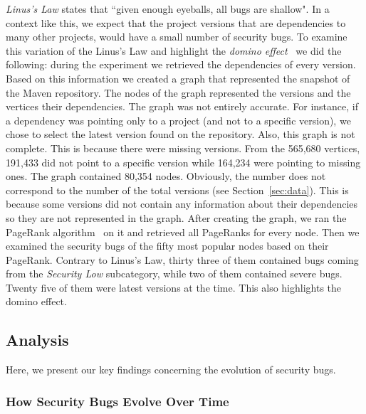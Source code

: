 \documentclass{sig-alternate}
\begin{document}
{\it Linus's Law} states that ``given enough eyeballs, all bugs are shallow".
In a context like this, we expect that
the project versions that are dependencies to many other projects,
would have a small number of security
bugs. To examine this variation of the Linus's Law and highlight the
{\it domino effect}~\cite{TH04} we did the
following: during the experiment we retrieved the
dependencies of every version. Based on this information we created a graph
that represented the snapshot of the Maven repository. The
nodes of the graph represented the versions and the vertices their dependencies.
The graph was not entirely accurate. For instance, if
a dependency was pointing only to a project (and not to a specific version), we chose to
select the latest version found on the repository. Also, this graph is not
complete. This is because there were missing versions.
From the 565,680 vertices, 191,433
did not point to a specific version while 164,234 were pointing to missing ones.
The graph contained 80,354 nodes. Obviously, the number does not correspond to
the number of the total versions (see Section~\ref{sec:data}). This is because
some versions did not contain any information about their dependencies so they
are not represented in the graph. After creating the graph, we ran the PageRank
algorithm~\cite{BP98} on it and retrieved all PageRanks for every node. Then we
examined the security bugs of the fifty most popular nodes based on their PageRank.
Contrary to Linus's Law, thirty three of them contained bugs coming from the
{\it Security Low} subcategory, while two of them contained severe bugs.
Twenty five of them were latest versions at the time. This also highlights
the domino effect.

\subsection{Analysis}
\label{sec:analysis}

Here, we present our key findings concerning the evolution of security bugs.

\subsubsection{How Security Bugs Evolve Over Time}
\end{document}
